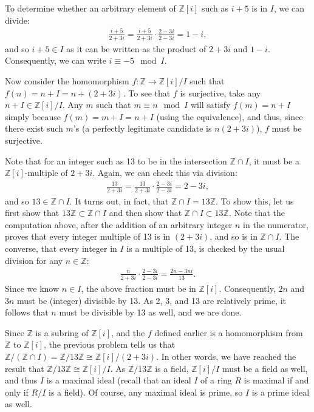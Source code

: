 \documentclass{../../mathnotes}
\begin{document}
To determine whether an arbitrary element of $\mathbb{Z}[i]$ such as $i+5$ is in $I$, we can divide:
\begin{align*}
    \frac{i+5}{2+3i}=\frac{i+5}{2+3i}\cdot\frac{2-3i}{2-3i}=1-i,
\end{align*}
and so $i+5\in I$ as it can be written as the product of $2+3i$ and $1-i$. Consequently, we can write $i\equiv-5\mod I$.

Now consider the homomorphism $f:\mathbb{Z}\to\mathbb{Z}[i]/I$ such that $f(n)=n+I=n+(2+3i)$. To see that $f$ is
surjective, take any $n+I\in\mathbb{Z}[i]/I$. Any $m$ such that $m\equiv n\mod I$ will satisfy $f(m)=n+I$ simply
because $f(m)=m+I=n+I$ (using the equivalence), and thus, since there exist such $m$'s (a perfectly legitimate candidate
is $n(2+3i)$), $f$ must be surjective.

Note that for an integer such as 13 to be in the intersection $\mathbb{Z}\cap I$, it must be a $\mathbb{Z}[i]$-multiple of $2+3i$.
Again, we can check this via division:
\begin{align*}
    \frac{13}{2+3i}=\frac{13}{2+3i}\cdot\frac{2-3i}{2-3i}=2-3i,
\end{align*}
and so $13\in\mathbb{Z}\cap I$. It turns out, in fact, that $\mathbb{Z}\cap I=13\mathbb{Z}$. To show this, let us
first show that $13\mathbb{Z}\subset \mathbb{Z}\cap I$ and then show that $\mathbb{Z}\cap I\subset 13\mathbb{Z}$.
Note that the computation above, after the addition of an arbitrary integer $n$ in the numerator, proves that every
integer multiple of 13 is in $(2+3i)$, and so is in $\mathbb{Z}\cap I$.
The converse, that every integer in $I$ is a multiple of 13, is checked by the usual division for any $n\in\mathbb{Z}$:
\begin{align*}
    \frac{n}{2+3i}\cdot\frac{2-3i}{2-3i}=\frac{2n-3ni}{13}.
\end{align*}
Since we know $n\in I$, the above fraction must be in $\mathbb{Z}[i]$. Consequently, $2n$ and $3n$ must be (integer)
divisible by 13. As 2, 3, and 13 are relatively prime, it follows that $n$ must be divisible by 13 as well, and
we are done.

Since $\mathbb{Z}$ is a subring of $\mathbb{Z}[i]$, and the $f$ defined earlier is a homomorphism from $\mathbb{Z}$
to $\mathbb{Z}[i]$, the previous problem tells us that
$\mathbb{Z}/\left( \mathbb{Z}\cap I \right)=\mathbb{Z}/13\mathbb{Z}\cong \mathbb{Z}[i]/(2+3i)$. In other words,
we have reached the result that $\mathbb{Z}/13\mathbb{Z}\cong \mathbb{Z}[i]/I$. As $\mathbb{Z}/13\mathbb{Z}$ is a
field, $\mathbb{Z}[i]/I$ must be a field as well, and thus $I$ is a maximal ideal (recall that an ideal $I$ of a ring
$R$ is maximal if and only if $R/I$ is a field). Of course, any maximal ideal is prime, so $I$ is a prime ideal as well.
\end{document}
